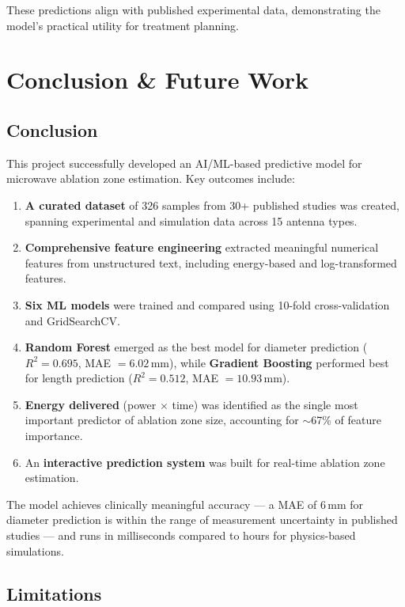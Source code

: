 \documentclass[12pt, a4paper]{article}
\begin{document}
These predictions align with published experimental data, demonstrating the model's practical utility for treatment planning.

\section{Conclusion \& Future Work}
\label{sec:conclusion}

\subsection{Conclusion}
\label{sec:conclusion-summary}

This project successfully developed an AI/ML-based predictive model for microwave ablation zone estimation. Key outcomes include:

\begin{enumerate}
    \item \textbf{A curated dataset} of 326 samples from 30+ published studies was created, spanning experimental and simulation data across 15 antenna types.
    \item \textbf{Comprehensive feature engineering} extracted meaningful numerical features from unstructured text, including energy-based and log-transformed features.
    \item \textbf{Six ML models} were trained and compared using 10-fold cross-validation and GridSearchCV.
    \item \textbf{Random Forest} emerged as the best model for diameter prediction ($R^2 = 0.695$, MAE $= 6.02$\,mm), while \textbf{Gradient Boosting} performed best for length prediction ($R^2 = 0.512$, MAE $= 10.93$\,mm).
    \item \textbf{Energy delivered} (power $\times$ time) was identified as the single most important predictor of ablation zone size, accounting for $\sim$67\% of feature importance.
    \item An \textbf{interactive prediction system} was built for real-time ablation zone estimation.
\end{enumerate}

The model achieves clinically meaningful accuracy --- a MAE of 6\,mm for diameter prediction is within the range of measurement uncertainty in published studies --- and runs in milliseconds compared to hours for physics-based simulations.

\subsection{Limitations}
\label{sec:limitations}
\end{document}
